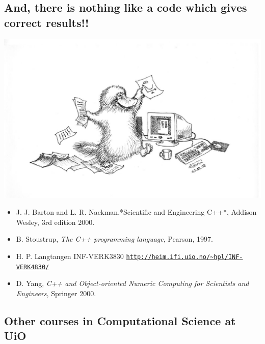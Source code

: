 \documentclass[%
oneside,                 %
final,                   %
10pt]{article}
\begin{document}
\noindent
\subsection*{And, there is nothing like a code which gives correct results!!}



\centerline{\includegraphics[width=0.6\linewidth]{fig-intro/Nebbdyr2.pdf}}



\begin{itemize}
 \item J. J. Barton and L. R. Nackman,*Scientific and Engineering C++*, Addison Wesley, 3rd edition 2000.

 \item B. Stoustrup, \emph{The C++ programming language}, Pearson, 1997.

 \item H. P. Langtangen INF-VERK3830 \href{{http://heim.ifi.uio.no/~hpl/INF-VERK4830/}}{\nolinkurl{http://heim.ifi.uio.no/~hpl/INF-VERK4830/}}

 \item D. Yang, \emph{C++ and Object-oriented Numeric Computing for Scientists and Engineers}, Springer 2000.
\end{itemize}

\noindent
\subsection*{Other courses in Computational Science at UiO}


\end{document}
